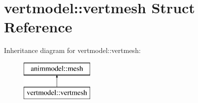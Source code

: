 \hypertarget{structvertmodel_1_1vertmesh}{}\section{vertmodel\+:\+:vertmesh Struct Reference}
\label{structvertmodel_1_1vertmesh}
Inheritance diagram for vertmodel\+:\+:vertmesh\+:\begin{figure}[H]
\begin{center}
\leavevmode
\includegraphics[height=2.000000cm]{structvertmodel_1_1vertmesh}
\end{center}
\end{figure}
